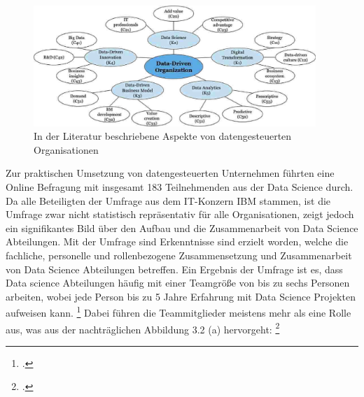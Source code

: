 \begin{figure}[htb]
    \centering
    \includegraphics[width=0.95\textwidth]{graphics/ddo aspects.png}
    \caption{In der Literatur beschriebene Aspekte von datengesteuerten Organisationen}
    \label{fig:DDOs aspects}
\end{figure}

Zur praktischen Umsetzung von datengesteuerten Unternehmen führten  eine Online Befragung mit insgesamt 183 Teilnehmenden aus der Data Science durch.
Da alle Beteiligten der Umfrage aus dem IT-Konzern IBM stammen, ist die Umfrage zwar nicht statistisch repräsentativ für alle Organisationen, zeigt jedoch ein signifikantes Bild über den Aufbau und die Zusammenarbeit von Data Science Abteilungen.
Mit der Umfrage sind Erkenntnisse sind erzielt worden, welche die fachliche, personelle und rollenbezogene Zusammensetzung und Zusammenarbeit von Data Science Abteilungen betreffen.
Ein Ergebnis der Umfrage ist es, dass Data science Abteilungen häufig mit einer Teamgröße von bis zu sechs Personen arbeiten, wobei jede Person bis zu 5 Jahre Erfahrung mit Data Science Projekten aufweisen kann. \footcite[Vgl.][S. 7]{Zhang.2020b}
Dabei führen die Teammitglieder meistens mehr als eine Rolle aus, was aus der nachträglichen Abbildung 3.2 (a) hervorgeht: \footcite[Vgl.][S. 7]{Zhang.2020b}

